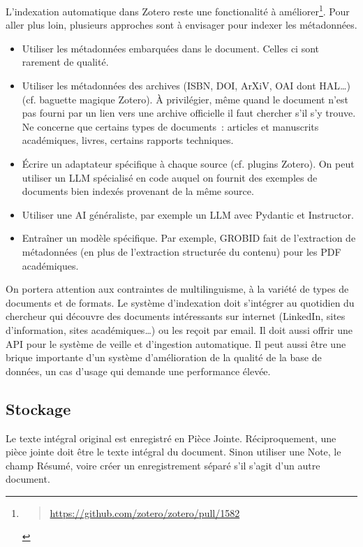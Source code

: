 \documentclass[a4paper,11pt]{report}
\providecommand{\tightlist}{\setlength{\itemsep}{0pt}\setlength{\parskip}{0pt}}
\begin{document}
L'indexation automatique dans Zotero reste une fonctionalité à améliorer\footnote{\begin{quote}
  \url{https://github.com/zotero/zotero/pull/1582}
  \end{quote}}. Pour aller plus loin, plusieurs approches sont à envisager pour indexer les métadonnées.

\begin{itemize}
\tightlist
\item
  Utiliser les métadonnées embarquées dans le document. Celles ci sont rarement de qualité.
\item
  Utiliser les métadonnées des archives (ISBN, DOI, ArXiV, OAI dont HAL\ldots) (cf. baguette magique Zotero). À privilégier, même quand le document n'est pas fourni par un lien vers une archive officielle il faut chercher s'il s'y trouve. Ne concerne que certains types de documents~: articles et manuscrits académiques, livres, certains rapports techniques.
\item
  Écrire un adaptateur spécifique à chaque source (cf. plugins Zotero). On peut utiliser un LLM spécialisé en code auquel on fournit des exemples de documents bien indexés provenant de la même source.
\item
  Utiliser une AI généraliste, par exemple un LLM avec Pydantic et Instructor.
\item
  Entraîner un modèle spécifique. Par exemple, GROBID fait de l'extraction de métadonnées (en plus de l'extraction structurée du contenu) pour les PDF académiques.
\end{itemize}

On portera attention aux contraintes de multilinguisme, à la variété de types de documents et de formats. Le système d'indexation doit s'intégrer au quotidien du chercheur qui découvre des documents intéressants sur internet (LinkedIn, sites d'information, sites académiques\ldots) ou les reçoit par email. Il doit aussi offrir une API pour le système de veille et d'ingestion automatique. Il peut aussi être une brique importante d'un système d'amélioration de la qualité de la base de données, un cas d'usage qui demande une performance élevée.

\subsection{Stockage}\label{stockage}

Le texte intégral original est enregistré en Pièce Jointe. Réciproquement, une pièce jointe doit être le texte intégral du document. Sinon utiliser une Note, le champ Résumé, voire créer un enregistrement séparé s'il s'agit d'un autre document.
\end{document}
